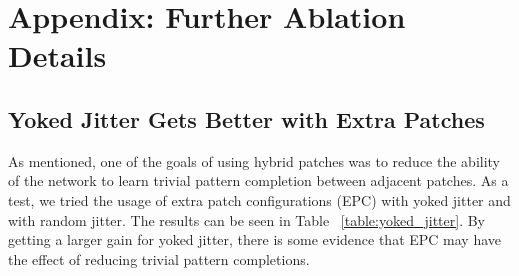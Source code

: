 \documentclass[10pt,twocolumn,letterpaper]{article}
\begin{document}
\section{Appendix: Further Ablation Details} \label{ablation_appendix}

\subsection{Yoked Jitter Gets Better with Extra Patches}

As mentioned, one of the goals of using hybrid patches was to reduce the ability of the network to learn trivial pattern completion between adjacent patches. As a test, we tried the usage of extra patch configurations (EPC) with yoked jitter and with random jitter. The results can be seen in Table  ~\ref{table:yoked_jitter}.  By getting a larger gain for yoked jitter, there is some evidence that EPC may have the effect of reducing trivial pattern completions.
\end{document}
